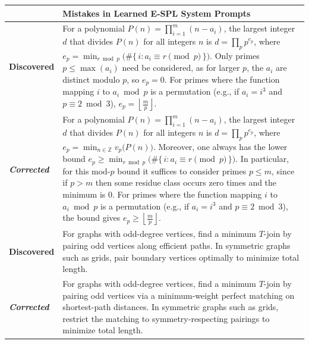 \documentclass{article}
\theoremstyle{plain}
\theoremstyle{definition}
\theoremstyle{remark}
\begin{document}
\begin{table}[t]
\centering
\small
\vspace{4pt}
\setlength{\tabcolsep}{3.5pt}
\renewcommand{\arraystretch}{1.0}
\begin{tabular}{%
  p{}|
  >{\raggedright\arraybackslash\renewcommand{\baselinestretch}{1.15}\selectfont}p{}
}

\toprule
\textbf{} & \textbf{Mistakes in Learned E-SPL System Prompts} \\
\midrule
\textbf{Discovered}
&
For a polynomial $P(n) = {\textstyle\prod}_{i=1}^m (n - a_i)$, the largest integer $d$ that divides $P(n)$ for all integers $n$ is $d = {\textstyle\prod}_{p} p^{e_p}$, {\color{Brown} where
$e_p = \min_{r \bmod p} \bigl(\#\{\, i : a_i \equiv r \!\!\pmod p \,\}\bigr).$
Only primes $p \le \max(a_i)$ need be considered, as for larger $p$, the $a_i$ are distinct modulo $p$, so $e_p = 0$.}
For primes where the function mapping $i$ to $a_i \bmod p$ is a permutation (e.g., if $a_i = i^3$ and $p \equiv 2 \bmod 3$), {\color{Brown}$e_p = {{\left\lfloor \frac{m}{p} \right\rfloor}}$.
} \\
\midrule
\textit{\textbf{Corrected}} 
&
For a polynomial $P(n) = \prod_{i=1}^m (n - a_i)$, the largest integer $d$ that divides $P(n)$ for all integers $n$ is $d = \prod_{p} p^{e_p}$, {\color{MidnightBlue} where $e_p = \min_{n \in \mathbb{Z}} v_p\!\bigl(P(n)\bigr).$ Moreover, one always has the lower bound $e_p \ge \min_{r \bmod p} \bigl(\#\{\, i : a_i \equiv r \!\!\pmod p \,\}\bigr).$ In particular, for this mod-$p$ bound it suffices to consider primes $p \le m$, since if $p>m$ then some residue class occurs zero times and the minimum is $0$.} 
For primes where the function mapping $i$ to $a_i \bmod p$ is a permutation (e.g., if $a_i = i^3$ and $p \equiv 2 \bmod 3$), the bound gives {\color{MidnightBlue}$e_p \boldsymbol{\ge} \left\lfloor \frac{m}{p} \right\rfloor.$
} \\
\midrule
\textbf{Discovered}
&
For graphs with odd-degree vertices, find a minimum \(T\)-join by {\color{Brown}pairing odd vertices along efficient paths}. In symmetric graphs such as grids, {\color{Brown}pair boundary vertices} optimally to minimize total length.
\\
\midrule
\textit{\textbf{Corrected}} 
&
For graphs with odd-degree vertices, find a minimum $T$-join by {\color{MidnightBlue}pairing odd vertices via a minimum-weight perfect matching on shortest-path distances}. In symmetric graphs such as grids, {\color{MidnightBlue}restrict the matching to symmetry-respecting pairings} to minimize total length.

\end{tabular}
\end{table}
\end{document}
